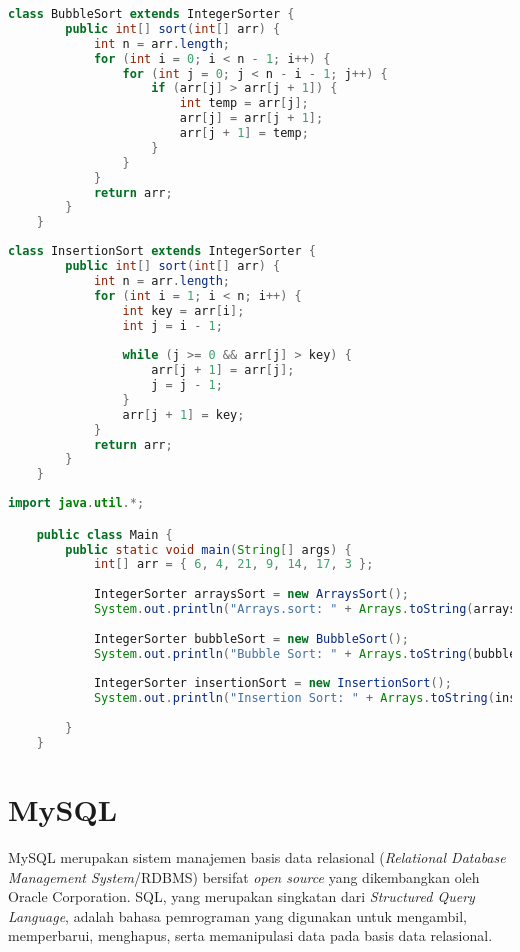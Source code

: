 \begin{lstlisting}[language=Java, caption=BubbleSort.java, basicstyle=\small\ttfamily]
    class BubbleSort extends IntegerSorter {
        public int[] sort(int[] arr) {
            int n = arr.length;
            for (int i = 0; i < n - 1; i++) {
                for (int j = 0; j < n - i - 1; j++) {
                    if (arr[j] > arr[j + 1]) {
                        int temp = arr[j];
                        arr[j] = arr[j + 1];
                        arr[j + 1] = temp;
                    }
                }
            }
            return arr;
        }
    }
\end{lstlisting}

\begin{lstlisting}[language=Java, caption=InsertionSort.java, basicstyle=\small\ttfamily]
    class InsertionSort extends IntegerSorter {
        public int[] sort(int[] arr) {
            int n = arr.length;
            for (int i = 1; i < n; i++) {
                int key = arr[i];
                int j = i - 1;
    
                while (j >= 0 && arr[j] > key) {
                    arr[j + 1] = arr[j];
                    j = j - 1;
                }
                arr[j + 1] = key;
            }
            return arr;
        }
    }
\end{lstlisting}

\begin{lstlisting}[language=Java, caption=Main.java, basicstyle=\small\ttfamily]
    import java.util.*;

    public class Main {
        public static void main(String[] args) {
            int[] arr = { 6, 4, 21, 9, 14, 17, 3 };
    
            IntegerSorter arraysSort = new ArraysSort();
            System.out.println("Arrays.sort: " + Arrays.toString(arraysSort.sort(arr.clone())));
    
            IntegerSorter bubbleSort = new BubbleSort();
            System.out.println("Bubble Sort: " + Arrays.toString(bubbleSort.sort(arr.clone())));
    
            IntegerSorter insertionSort = new InsertionSort();
            System.out.println("Insertion Sort: " + Arrays.toString(insertionSort.sort(arr.clone())));
    
        }
    }
\end{lstlisting}


\section{MySQL ~\cite{oracle:24:mysql8.4}}
\label{sec:mysql}
MySQL merupakan sistem manajemen basis data relasional (\textit{Relational Database Management System}/RDBMS) bersifat \textit{open source} yang dikembangkan oleh Oracle Corporation. SQL, yang merupakan singkatan dari \textit{Structured Query Language}, adalah bahasa pemrograman yang digunakan untuk mengambil, memperbarui, menghapus, serta memanipulasi data pada basis data relasional.

